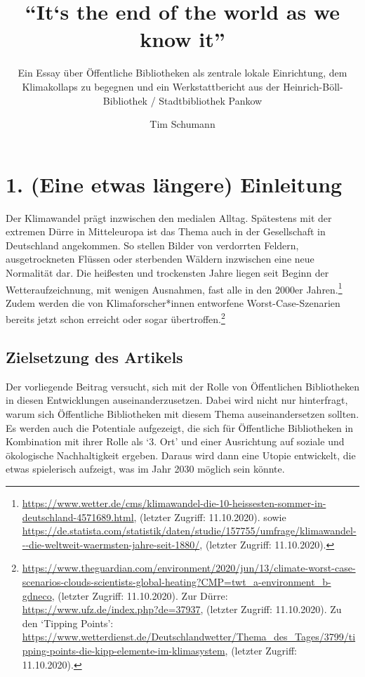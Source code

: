 \documentclass[a4paper,
fontsize=11pt,
oneside,
numbers=noperiodatend,
parskip=half-,
bibliography=totoc,
final
]{scrartcl}
\title{\LARGE{\enquote{It‘s the end of the world as we know it}}}%
\subtitle{\Large{Ein Essay über Öffentliche Bibliotheken als zentrale lokale Einrichtung, dem Klimakollaps zu begegnen und ein Werkstattbericht aus der Heinrich-Böll-Bibliothek / Stadtbibliothek Pankow}}
\author{Tim Schumann} %
\date{}
\begin{document}
\maketitle
\thispagestyle{fancyplain} 


\hypertarget{eine-etwas-luxe4ngere-einleitung}{%
\section{1. (Eine etwas längere)
Einleitung}\label{eine-etwas-luxe4ngere-einleitung}}

Der Klimawandel prägt inzwischen den medialen Alltag. Spätestens mit der
extremen Dürre in Mitteleuropa ist das Thema auch in der Gesellschaft in
Deutschland angekommen. So stellen Bilder von verdorrten Feldern,
ausgetrockneten Flüssen oder sterbenden Wäldern inzwischen eine neue
Normalität dar. Die heißesten und trockensten Jahre liegen seit Beginn
der Wetteraufzeichnung, mit wenigen Ausnahmen, fast alle in den 2000er
Jahren.\footnote{\url{https://www.wetter.de/cms/klimawandel-die-10-heissesten-sommer-in-deutschland-4571689.html},
  (letzter Zugriff: 11.10.2020). sowie
  \url{https://de.statista.com/statistik/daten/studie/157755/umfrage/klimawandel---die-weltweit-waermsten-jahre-seit-1880/},
  (letzter Zugriff: 11.10.2020).} Zudem werden die von
Klimaforscher*innen entworfene Worst-Case-Szenarien bereits jetzt schon
erreicht oder sogar übertroffen.\footnote{\url{https://www.theguardian.com/environment/2020/jun/13/climate-worst-case-scenarios-clouds-scientists-global-heating?CMP=twt_a-environment_b-gdneco},
  (letzter Zugriff: 11.10.2020). Zur Dürre:
  \url{https://www.ufz.de/index.php?de=37937}, (letzter Zugriff:
  11.10.2020). Zu den \enquote*{Tipping Points}:
  \url{https://www.wetterdienst.de/Deutschlandwetter/Thema_des_Tages/3799/tipping-points-die-kipp-elemente-im-klimasystem},
  (letzter Zugriff: 11.10.2020).}

\hypertarget{zielsetzung-des-artikels}{%
\subsection{Zielsetzung des Artikels}\label{zielsetzung-des-artikels}}

Der vorliegende Beitrag versucht, sich mit der Rolle von Öffentlichen
Bibliotheken in diesen Entwicklungen auseinanderzusetzen. Dabei wird
nicht nur hinterfragt, warum sich Öffentliche Bibliotheken mit diesem
Thema auseinandersetzen sollten. Es werden auch die Potentiale
aufgezeigt, die sich für Öffentliche Bibliotheken in Kombination mit
ihrer Rolle als \enquote*{3. Ort} und einer Ausrichtung auf soziale und
ökologische Nachhaltigkeit ergeben. Daraus wird dann eine Utopie
entwickelt, die etwas spielerisch aufzeigt, was im Jahr 2030 möglich
sein könnte.
\end{document}
